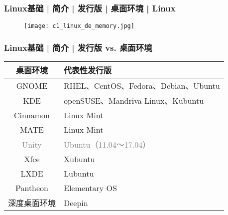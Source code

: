 \begin{frame}
  \frametitle{Linux基础 | 简介 | 发行版 | 桌面环境 | Linux}
  \begin{figure}
    \centering
    \texttt{[image: c1\_linux\_de\_memory.jpg]}
  \end{figure}
\end{frame}

\begin{frame}
  \frametitle{Linux基础 | 简介 | \alert{发行版 vs. 桌面环境}}
  \begin{table}
    \centering
    \begin{tabular}{cl}
      \hline
      \rowcolor{blue!50}桌面环境 & 代表性发行版\\
      \hline
      GNOME & RHEL、CentOS、Fedora、Debian、Ubuntu\\
      KDE & openSUSE、Mandriva Linux、Kubuntu\\
      Cinnamon & Linux Mint\\
      MATE & Linux Mint\\
      \textcolor{gray}{Unity} & \textcolor{gray}{Ubuntu（11.04～17.04）}\\
      Xfce & Xubuntu\\
      LXDE & Lubuntu\\
      Pantheon & Elementary OS\\
      深度桌面环境 & Deepin\\
      \hline
    \end{tabular}
  \end{table}
\end{frame}

